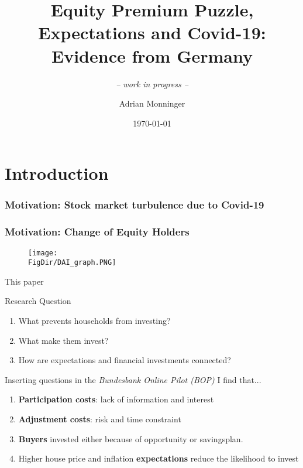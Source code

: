 \documentclass[pdflatex]{beamer}
\title[EPP, Expectations and Covid-19] {Equity Premium Puzzle, Expectations and Covid-19:\\ Evidence from Germany}
\subtitle{ \vspace{0.25em} \textit{-- work in progress --} }
\author[A. Monninger]{Adrian Monninger\inst{1}}
\institute[]{\inst{1} Johns Hopkins University}
\date{\today}
\begin{document}

\begin{frame}
	\titlepage
\end{frame}


\section{Introduction}
\begin{frame}[label = motivation_2]
	\frametitle{Motivation: Stock market turbulence due to Covid-19}
	
	\vspace{-1em}
	\hyperlink{sp500}{}
	\hyperlink{eurostoxx50}{}
\end{frame}

\begin{frame}[label = motivation_2]
	\frametitle{Motivation: Change of Equity Holders}
	\begin{figure}
		\centering
		\texttt{[image: \\FigDir/DAI\_graph.PNG]}
	\end{figure}
\end{frame}

\begin{frame}{This paper}
	
	\begin{block}{Research Question}
		{\begin{enumerate}
				\item What prevents households from investing?
				\item What make them invest?
				\item How are expectations and financial investments connected?
		\end{enumerate}}
	\end{block}
	\vspace{1em}
	\pause
	\begin{block}{Inserting questions in the \textit{Bundesbank Online Pilot (BOP)} I find that...}
		{
			\pause
			\begin{enumerate}
				\item \textbf{Participation costs}: lack of information and interest
				\item \textbf{Adjustment costs}: risk and time constraint
				\item \textbf{Buyers} invested either because of opportunity or savingsplan. 
				\item Higher house price and inflation \textbf{expectations} reduce the likelihood to invest
			\end{enumerate}
		}
		
	\end{block}
\end{frame}
\end{document}
